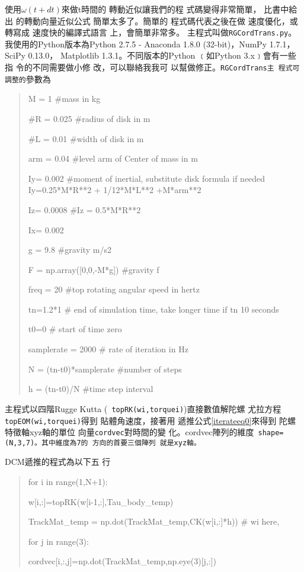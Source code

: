 \documentclass{article}
\begin{document}
使用$\omega (t+dt)$來做t時間的%
轉動近似讓我們的程%
式碼變得非常簡單，%
比書中\cite[Page ??, Eqation ??]{titterton}給出%
的轉動向量近似公式%
簡單太多了。簡單的%
程式碼代表之後在做%
速度優化，或轉寫成%
速度快的編譯式語言%
上，會簡單非常多。%
主程式叫做\texttt{RGCordTrans.py}。%
我使用的Python版本為Python 2.7.5 -
Anaconda 1.8.0 (32-bit)，NumPy 1.7.1，SciPy 0.13.0，%
Matplotlib 1.3.1。不同版本的Python%
﹝如Python 3.x﹞會有一些指%
令的不同需要做小修%
改，可以聯絡我我可%
以幫做修正。\texttt{RGCordTrans主%
程式可調整的}參數為

\begin{quotation}
M = 1 \#mass in kg

\#R = 0.025 \#radius of disk in m

\#L = 0.01 \#width of disk in m

arm = 0.04 \#level arm of Center of mass in m

Iy= 0.002 \#moment of inertial, substitute disk formula if needed
Iy=0.25*M*R**2 + 1/12*M*L**2 +M*arm**2

Iz= 0.0008 \#Iz = 0.5*M*R**2

Ix= 0.002

g = 9.8 \#gravity m/s2

F = np.array([0,0,-M*g]) \#gravity f

freq = 20 \#top rotating angular speed in hertz

tn=1.2*1 \# end of simulation time, take longer time if tn \TEXTsymbol{>} 10
seconds

t0=0 \# start of time zero

samplerate = 2000 \# rate of iteration in Hz

N = (tn-t0)*samplerate \#number of steps

h = (tn-t0)/N \#time step interval
\end{quotation}

主程式以四階Rugge Kutta (\texttt{%
topRK(wi,torquei)})直接數值解陀螺%
尤拉方程\texttt{topEOM(wi,torquei)}得到%
貼體角速度，接著用%
遞推公式\ref{iterateeq0}來得到%
陀螺特徵軸xyz軸的單位%
向量\texttt{cordvec}對時間的變%
化。cordvec陣列的維度\texttt{%
shape=(N,3,7)。其中維度為7的%
方向的首要三個陣列%
就是xyz軸。}

DCM遞推的程式為以下五%
行

\begin{quotation}
for i in range(1,N+1):

w[i,:]=topRK(w[i-1,:],Tau\_body\_temp)

TrackMat\_temp = np.dot(TrackMat\_temp,CK(w[i,:]*h)) \qquad \# wi here,

for j in range(3):

cordvec[i,:,j]=np.dot(TrackMat\_temp,np.eye(3)[j,:])
\end{quotation}
\end{document}
